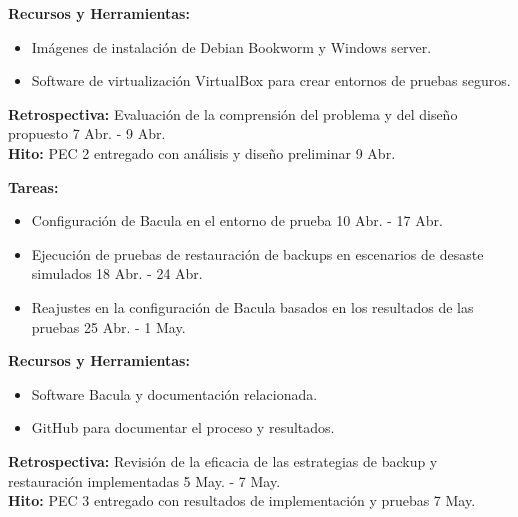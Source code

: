 \begin{tcolorbox}[phasebox, title=Fases del trabajo]
\begin{tcolorbox}[sprintbox, title= Sprint 2 y 3: Análisis de requisitos y diseño inicial.]
\begin{itemize}
        \end{itemize}
        \textbf{Recursos y Herramientas:}
        \begin{itemize}
            \item Imágenes de instalación de Debian Bookworm y Windows server.

            \item Software de virtualización VirtualBox para crear entornos de pruebas seguros.

        \end{itemize}
        \textbf{Retrospectiva:} Evaluación de la comprensión del problema y del diseño propuesto  7 Abr. - 9 Abr.\\
        \textbf{Hito:} PEC 2 entregado con análisis y diseño preliminar 9 Abr.

    \end{tcolorbox}


    \begin{tcolorbox}[sprintbox, title= Sprint 4 a 6: Configuración de Bacula y pruebas]
        \textbf{Tareas:}
        \begin{itemize}
            \item Configuración de Bacula en el entorno de prueba  10 Abr. - 17 Abr.

            \item Ejecución de pruebas de restauración de backups en escenarios de desaste simulados 18 Abr. - 24 Abr.

            \item Reajustes en la configuración de Bacula basados en los resultados de las pruebas 25 Abr. - 1 May.

            
        \end{itemize}
        \textbf{Recursos y Herramientas:}
        \begin{itemize}
            \item Software Bacula y documentación relacionada.
            \item GitHub para documentar el proceso y resultados.

        \end{itemize}
        \textbf{Retrospectiva:} Revisión de la eficacia de las estrategias de backup y restauración implementadas 5 May. - 7 May.\\
        \textbf{Hito:} PEC 3 entregado con resultados de implementación y pruebas 7 May.

    \end{tcolorbox}


\end{tcolorbox}
